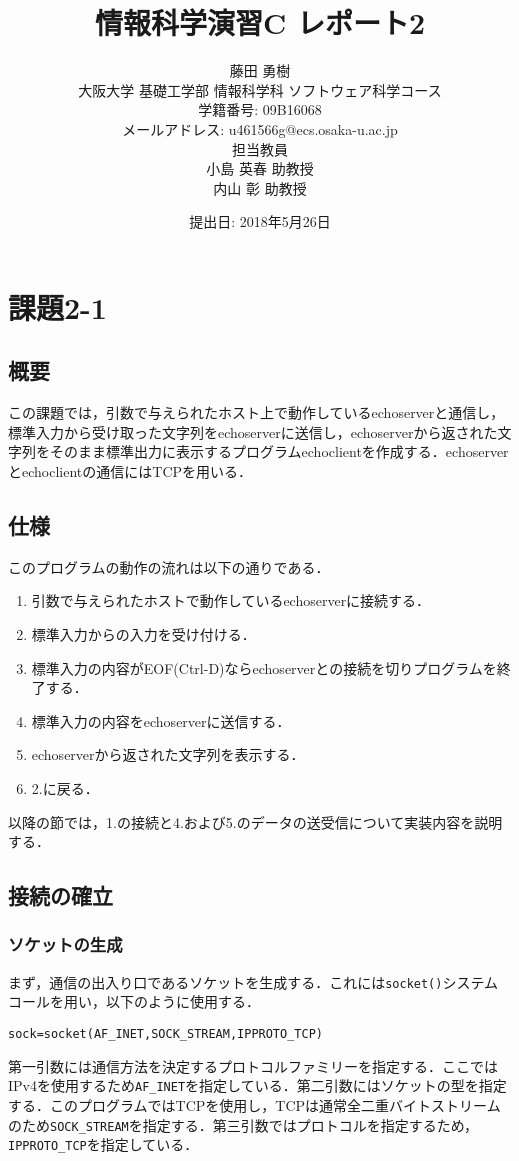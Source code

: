 \documentclass[a4j,10pt,titlepage]{jsarticle}
\title{情報科学演習C レポート2}
\author{藤田 勇樹 \\
大阪大学 基礎工学部 情報科学科 ソフトウェア科学コース\\
学籍番号: 09B16068 \\
メールアドレス: u461566g@ecs.osaka-u.ac.jp \\
担当教員\\
小島 英春 助教授 \\
内山 彰 助教授}
\date{提出日: 2018年5月26日}
\begin{document}
\maketitle
\section{課題2-1}
\subsection{概要}
この課題では，引数で与えられたホスト上で動作しているechoserverと通信し，標準入力から受け取った文字列をechoserverに送信し，echoserverから返された文字列をそのまま標準出力に表示するプログラムechoclientを作成する．echoserverとechoclientの通信にはTCPを用いる．

\subsection{仕様}
このプログラムの動作の流れは以下の通りである．
\begin{enumerate}
  \item 引数で与えられたホストで動作しているechoserverに接続する．
  \item 標準入力からの入力を受け付ける．
  \item 標準入力の内容がEOF(Ctrl-D)ならechoserverとの接続を切りプログラムを終了する．
  \item 標準入力の内容をechoserverに送信する．
  \item echoserverから返された文字列を表示する．
  \item 2.に戻る．
\end{enumerate}

以降の節では，1.の接続と4.および5.のデータの送受信について実装内容を説明する．

\subsection{接続の確立}
\subsubsection{ソケットの生成}
まず，通信の出入り口であるソケットを生成する．これには\verb|socket()|システムコールを用い，以下のように使用する．
\begin{verbatim}
sock=socket(AF_INET,SOCK_STREAM,IPPROTO_TCP)
\end{verbatim}
第一引数には通信方法を決定するプロトコルファミリーを指定する．ここではIPv4を使用するため\verb|AF_INET|を指定している．第二引数にはソケットの型を指定する．このプログラムではTCPを使用し，TCPは通常全二重バイトストリームのため\verb|SOCK_STREAM|を指定する．第三引数ではプロトコルを指定するため，\verb|IPPROTO_TCP|を指定している．
\end{document}
